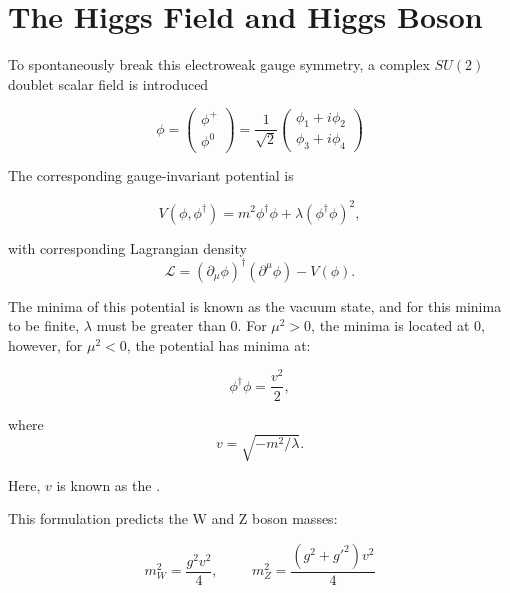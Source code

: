 \section{The Higgs Field and Higgs Boson}

To spontaneously break this electroweak gauge symmetry, a complex $SU(2)$ doublet scalar field is introduced

\begin{equation}
\phi = \begin{pmatrix} \phi^+ \\ \phi^0 \end{pmatrix}
    = \frac{1}{\sqrt{2}}\begin{pmatrix}
        \phi_1 + i\phi_2 \\ \phi_3 + i\phi_4
    \end{pmatrix}
\end{equation}

The corresponding gauge-invariant potential is 

\begin{equation}
    V(\phi,\phi^\dagger) = m^2 \phi^\dagger \phi + \lambda (\phi^\dagger \phi)^2,
\end{equation}

with corresponding Lagrangian density
\begin{equation}
    \mathcal{L} = (\partial_{\mu}\phi)^\dagger (\partial^{\mu}\phi) - V(\phi).
\end{equation}

The minima of this potential is known as the vacuum state, and for this minima to be finite, $\lambda$ must be greater than 0. For $\mu^2 >0$, the minima is located at 0, however, for $\mu^2<0$, the potential has minima at:


\begin{equation}
    \phi^\dagger \phi = \frac{v^2}{2},
\end{equation}

where 
\begin{equation}
    v = \sqrt{-m^2 / \lambda}.
\end{equation}



Here, $v$ is known as the . 

This formulation predicts the W and Z boson masses:

\begin{equation}
    m^2_W = \frac{g^2 v^2}{4}, \hspace{1cm} m^2_Z = \frac{(g^2 +g'^2)v^2}{4}
\end{equation}


